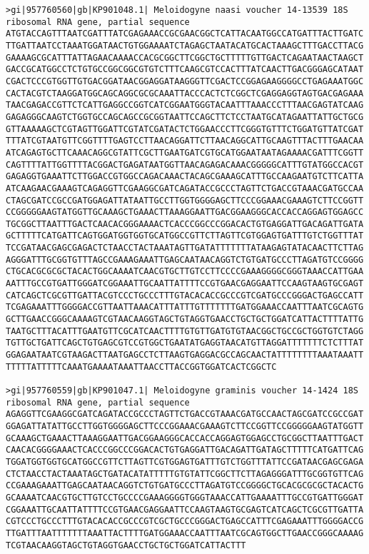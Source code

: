 \documentclass[11pt]{article}
\begin{document}
\begin{Verbatim}[commandchars=\\\{\}]
>gi|957760560|gb|KP901048.1| Meloidogyne naasi voucher 14-13539 18S ribosomal RNA gene, partial sequence
ATGTACCAGTTTAATCGATTTATCGAGAAACCGCGAACGGCTCATTACAATGGCCATGATTTACTTGATC
TTGATTAATCCTAAATGGATAACTGTGGAAAATCTAGAGCTAATACATGCACTAAAGCTTTGACCTTACG
GAAAAGCGCATTTATTAGAACAAAACCACGCGGCTTCGGCTGCTTTTTGTTGACTCAGAATAACTAAGCT
GACCGCATGGCCTCTGTGCCGGCGGCGTGTCTTTCAAGCGTCCACTTTATCAACTTGACGGGAGCATAAT
CGACTCCCGTGGTTGTGACGGATAACGGAGGATAAGGGTTCGACTCCGGAGAAGGGGCCTGAGAAATGGC
CACTACGTCTAAGGATGGCAGCAGGCGCGCAAATTACCCACTCTCGGCTCGAGGAGGTAGTGACGAGAAA
TAACGAGACCGTTCTCATTGAGGCCGGTCATCGGAATGGGTACAATTTAAACCCTTTAACGAGTATCAAG
GAGAGGGCAAGTCTGGTGCCAGCAGCCGCGGTAATTCCAGCTTCTCCTAATGCATAGAATTATTGCTGCG
GTTAAAAAGCTCGTAGTTGGATTCGTATCGATACTCTGGAACCCTTCGGGTGTTTCTGGATGTTATCGAT
TTTATCGTAATGTTCGGTTTTGAGTCCTTAACAGGATTCTTAACAGGCATTGCAAGTTTACTTTGAACAA
ATCAGAGTGCTTCAAACAGGCGTATTCGCTTGAATGATCGTGCATGGAATAATAGAAAACGATTTCGGTT
CAGTTTTATTGGTTTTACGGACTGAGATAATGGTTAACAGAGACAAACGGGGGCATTTGTATGGCCACGT
GAGAGGTGAAATTCTTGGACCGTGGCCAGACAAACTACAGCGAAAGCATTTGCCAAGAATGTCTTCATTA
ATCAAGAACGAAAGTCAGAGGTTCGAAGGCGATCAGATACCGCCCTAGTTCTGACCGTAAACGATGCCAA
CTAGCGATCCGCCGATGGAGATTATAATTGCCTTGGTGGGGAGCTTCCCGGAAACGAAAGTCTTCCGGTT
CCGGGGGAAGTATGGTTGCAAAGCTGAAACTTAAAGGAATTGACGGAAGGGCACCACCAGGAGTGGAGCC
TGCGGCTTAATTTGACTCAACACGGGAAAACTCACCCGGCCCGGACACTGTGAGGATTGACAGATTGATA
GCTTTTTCATGATTCAGTGGATGGTGGTGCATGGCCGTTCTTAGTTCGTGGAGTGATTTGTCTGGTTTAT
TCCGATAACGAGCGAGACTCTAACCTACTAAATAGTTGATATTTTTTTATAAGAGTATACAACTTCTTAG
AGGGATTTGCGGTGTTTAGCCGAAAGAAATTGAGCAATAACAGGTCTGTGATGCCCTTAGATGTCCGGGG
CTGCACGCGCGCTACACTGGCAAAATCAACGTGCTTGTCCTTCCCCGAAAGGGGCGGGTAAACCATTGAA
AATTTGCCGTGATTGGGATCGGAAATTGCAATTATTTTCCGTGAACGAGGAATTCCAAGTAAGTGCGAGT
CATCAGCTCGCGTTGATTACGTCCCTGCCCTTTGTACACACCGCCCGTCGATGCCCGGGACTGAGCCATT
TCGAGAAATTTGGGGACCGTTAATTAAACATTTATTTGTTTTTTTGATGGAAACCAATTTAATCGCAGTG
GCTTGAACCGGGCAAAAGTCGTAACAAGGTAGCTGTAGGTGAACCTGCTGCTGGATCATTACTTTTATTG
TAATGCTTTACATTTGAATGTTCGCATCAACTTTTGTGTTGATGTGTAACGGCTGCCGCTGGTGTCTAGG
TGTTGCTGATTCAGCTGTGAGCGTCCGTGGCTGAATATGAGGTAACATGTTAGGATTTTTTTCTCTTTAT
GGAGAATAATCGTAAGACTTAATGAGCCTCTTAAGTGAGGACGCCAGCAACTATTTTTTTTAAATAAATT
TTTTTATTTTTCAAATGAAAATAAATTAACCTTACCGGTGGATCACTCGGCTC

>gi|957760559|gb|KP901047.1| Meloidogyne graminis voucher 14-1424 18S ribosomal RNA gene, partial sequence
AGAGGTTCGAAGGCGATCAGATACCGCCCTAGTTCTGACCGTAAACGATGCCAACTAGCGATCCGCCGAT
GGAGATTATATTGCCTTGGTGGGGAGCTTCCCGGAAACGAAAGTCTTCCGGTTCCGGGGGAAGTATGGTT
GCAAAGCTGAAACTTAAAGGAATTGACGGAAGGGCACCACCAGGAGTGGAGCCTGCGGCTTAATTTGACT
CAACACGGGGAAACTCACCCGGCCCGGACACTGTGAGGATTGACAGATTGATAGCTTTTTCATGATTCAG
TGGATGGTGGTGCATGGCCGTTCTTAGTTCGTGGAGTGATTTGTCTGGTTTATTCCGATAACGAGCGAGA
CTCTAACCTACTAAATAGCTGATACATATTTTTGTGTATTCGGCTTCTTAGAGGGATTTGCGGTGTTCAG
CCGAAAGAAATTGAGCAATAACAGGTCTGTGATGCCCTTAGATGTCCGGGGCTGCACGCGCGCTACACTG
GCAAAATCAACGTGCTTGTCCTGCCCCGAAAGGGGTGGGTAAACCATTGAAAATTTGCCGTGATTGGGAT
CGGAAATTGCAATTATTTTCCGTGAACGAGGAATTCCAAGTAAGTGCGAGTCATCAGCTCGCGTTGATTA
CGTCCCTGCCCTTTGTACACACCGCCCGTCGCTGCCCGGGACTGAGCCATTTCGAGAAATTTGGGGACCG
TTGATTTAATTTTTTTAAATTACTTTTGATGGAAACCAATTTAATCGCAGTGGCTTGAACCGGGCAAAAG
TCGTAACAAGGTAGCTGTAGGTGAACCTGCTGCTGGATCATTACTTT


\end{Verbatim}
\end{document}
